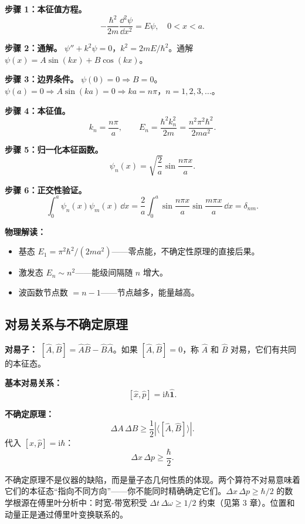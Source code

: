 \textbf{步骤 1：本征值方程。}
\[
-\frac{\hbar^2}{2m}\frac{\dd^2\psi}{\dd x^2} = E\psi,\quad 0<x<a.
\]

\textbf{步骤 2：通解。}
$\psi'' + k^2\psi = 0$，$k^2 = 2mE/\hbar^2$。通解 $\psi(x)=A\sin(kx)+B\cos(kx)$。

\textbf{步骤 3：边界条件。}
$\psi(0)=0 \Rightarrow B=0$。$\psi(a)=0 \Rightarrow A\sin(ka)=0 \Rightarrow ka=n\pi$，$n=1,2,3,\dots$。

\textbf{步骤 4：本征值。}
\[
k_n = \frac{n\pi}{a},\qquad
E_n = \frac{\hbar^2 k_n^2}{2m} = \frac{n^2\pi^2\hbar^2}{2ma^2}.
\]

\textbf{步骤 5：归一化本征函数。}
\[
\psi_n(x) = \sqrt{\frac{2}{a}}\sin\frac{n\pi x}{a}.
\]

\textbf{步骤 6：正交性验证。}
\[
\int_0^a \psi_n(x)\psi_m(x)\,\dd x = \frac{2}{a}\int_0^a \sin\frac{n\pi x}{a}\sin\frac{m\pi x}{a}\,\dd x = \delta_{nm}.
\]

\textbf{物理解读：}
\begin{itemize}
  \item 基态 $E_1 = \pi^2\hbar^2/(2ma^2)$——零点能，不确定性原理的直接后果。
  \item 激发态 $E_n\sim n^2$——能级间隔随 $n$ 增大。
  \item 波函数节点数 $=n-1$——节点越多，能量越高。
\end{itemize}

\subsection{对易关系与不确定原理}

\textbf{对易子：} $[\hat{A},\hat{B}] = \hat{A}\hat{B} - \hat{B}\hat{A}$。如果 $[\hat{A},\hat{B}]=0$，称 $\hat{A}$ 和 $\hat{B}$ 对易，它们有共同的本征态。

\textbf{基本对易关系：}
\[
[\hat{x},\hat{p}] = \mathrm{i}\hbar\hat{\mathbf{1}}.
\]

\textbf{不确定原理：}
\[
\Delta A\,\Delta B \geq \frac12|\langle[\hat{A},\hat{B}]\rangle|.
\]
代入 $[\hat{x},\hat{p}]=\mathrm{i}\hbar$：
\[
\Delta x\,\Delta p \geq \frac{\hbar}{2}.
\]

\begin{insight}[不确定原理的几何解释]
不确定原理不是仪器的缺陷，而是量子态几何性质的体现。两个算符不对易意味着它们的本征态“指向不同方向”——你不能同时精确确定它们。$\Delta x\,\Delta p \geq \hbar/2$ 的数学根源在傅里叶分析中：时宽-带宽积受 $\Delta t\,\Delta\omega \geq 1/2$ 约束（见第 3 章）。位置和动量正是通过傅里叶变换联系的。
\end{insight}

